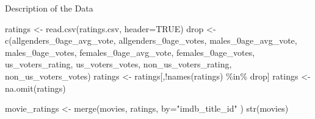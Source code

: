 \documentclass[
  ignorenonframetext,
]{beamer}
\newenvironment{Shaded}{\begin{snugshade}}{\end{snugshade}}
\newcommand{\AttributeTok}[1]{\textcolor[rgb]{0.77,0.63,0.00}{#1}}
\newcommand{\ConstantTok}[1]{\textcolor[rgb]{0.00,0.00,0.00}{#1}}
\newcommand{\FunctionTok}[1]{\textcolor[rgb]{0.00,0.00,0.00}{#1}}
\newcommand{\NormalTok}[1]{#1}
\newcommand{\OtherTok}[1]{\textcolor[rgb]{0.56,0.35,0.01}{#1}}
\newcommand{\SpecialCharTok}[1]{\textcolor[rgb]{0.00,0.00,0.00}{#1}}
\newcommand{\StringTok}[1]{\textcolor[rgb]{0.31,0.60,0.02}{#1}}
\begin{document}
\begin{frame}[fragile]{Description of the Data}
\begin{Shaded}
\begin{Highlighting}[]
\NormalTok{ratings }\OtherTok{\textless{}{-}} \FunctionTok{read.csv}\NormalTok{(}\StringTok{\textquotesingle{}ratings.csv\textquotesingle{}}\NormalTok{, }\AttributeTok{header=}\ConstantTok{TRUE}\NormalTok{)}
\NormalTok{drop }\OtherTok{\textless{}{-}} \FunctionTok{c}\NormalTok{(}\StringTok{\textquotesingle{}allgenders\_0age\_avg\_vote\textquotesingle{}}\NormalTok{, }\StringTok{\textquotesingle{}allgenders\_0age\_votes\textquotesingle{}}\NormalTok{, }\StringTok{\textquotesingle{}males\_0age\_avg\_vote\textquotesingle{}}\NormalTok{, }\StringTok{\textquotesingle{}males\_0age\_votes\textquotesingle{}}\NormalTok{,}
          \StringTok{\textquotesingle{}females\_0age\_avg\_vote\textquotesingle{}}\NormalTok{, }\StringTok{\textquotesingle{}females\_0age\_votes\textquotesingle{}}\NormalTok{, }\StringTok{\textquotesingle{}us\_voters\_rating\textquotesingle{}}\NormalTok{, }\StringTok{\textquotesingle{}us\_voters\_votes\textquotesingle{}}\NormalTok{, }
          \StringTok{\textquotesingle{}non\_us\_voters\_rating\textquotesingle{}}\NormalTok{, }\StringTok{\textquotesingle{}non\_us\_voters\_votes\textquotesingle{}}\NormalTok{)}
\NormalTok{ratings }\OtherTok{\textless{}{-}}\NormalTok{ ratings[,}\SpecialCharTok{!}\FunctionTok{names}\NormalTok{(ratings) }\SpecialCharTok{\%in\%}\NormalTok{ drop]}
\NormalTok{ratings }\OtherTok{\textless{}{-}} \FunctionTok{na.omit}\NormalTok{(ratings)}

\NormalTok{movie\_ratings }\OtherTok{\textless{}{-}} \FunctionTok{merge}\NormalTok{(movies, ratings, }\AttributeTok{by=}\StringTok{"imdb\_title\_id"}\NormalTok{ )}
\FunctionTok{str}\NormalTok{(movies)}
\end{Highlighting}
\end{Shaded}


\end{frame}
\end{document}
